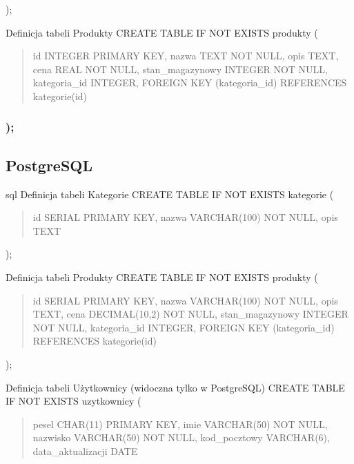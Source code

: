 \documentclass[letterpaper,10pt,polish]{sphinxmanual}
\begin{document}
\sphinxAtStartPar
);

\sphinxAtStartPar
\textendash{} Definicja tabeli Produkty
CREATE TABLE IF NOT EXISTS produkty (
\begin{quote}

\sphinxAtStartPar
id INTEGER PRIMARY KEY,
nazwa TEXT NOT NULL,
opis TEXT,
cena REAL NOT NULL,
stan\_magazynowy INTEGER NOT NULL,
kategoria\_id INTEGER,
FOREIGN KEY (kategoria\_id) REFERENCES kategorie(id)
\end{quote}


\subsubsection{);}
\label{\detokenize{rozdzial3/index:id11}}

\subsection{PostgreSQL}
\label{\detokenize{rozdzial3/index:postgresql}}
\sphinxAtStartPar
{\color{red}\bfseries{}\textasciigrave{}\textasciigrave{}}{\color{red}\bfseries{}\textasciigrave{}}sql
\textendash{} Definicja tabeli Kategorie
CREATE TABLE IF NOT EXISTS kategorie (
\begin{quote}

\sphinxAtStartPar
id SERIAL PRIMARY KEY,
nazwa VARCHAR(100) NOT NULL,
opis TEXT
\end{quote}

\sphinxAtStartPar
);

\sphinxAtStartPar
\textendash{} Definicja tabeli Produkty
CREATE TABLE IF NOT EXISTS produkty (
\begin{quote}

\sphinxAtStartPar
id SERIAL PRIMARY KEY,
nazwa VARCHAR(100) NOT NULL,
opis TEXT,
cena DECIMAL(10,2) NOT NULL,
stan\_magazynowy INTEGER NOT NULL,
kategoria\_id INTEGER,
FOREIGN KEY (kategoria\_id) REFERENCES kategorie(id)
\end{quote}

\sphinxAtStartPar
);

\sphinxAtStartPar
\textendash{} Definicja tabeli Użytkownicy (widoczna tylko w PostgreSQL)
CREATE TABLE IF NOT EXISTS uzytkownicy (
\begin{quote}

\sphinxAtStartPar
pesel CHAR(11) PRIMARY KEY,
imie VARCHAR(50) NOT NULL,
nazwisko VARCHAR(50) NOT NULL,
kod\_pocztowy VARCHAR(6),
data\_aktualizacji DATE
\end{quote}
\end{document}
